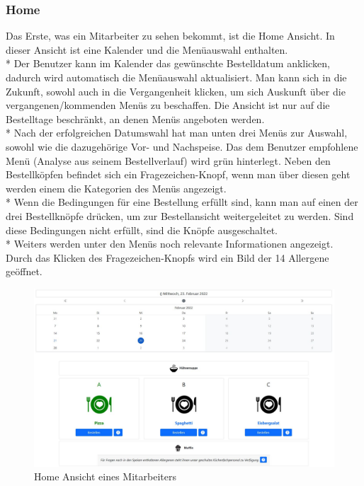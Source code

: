 \subsubsection {Home}
Das Erste, was ein Mitarbeiter zu sehen bekommt, ist die Home Ansicht. In dieser Ansicht ist eine Kalender und die Menüauswahl enthalten. \\*
Der Benutzer kann im Kalender das gewünschte Bestelldatum anklicken, dadurch wird automatisch die Menüauswahl aktualisiert. Man kann sich in die Zukunft, sowohl auch 
in die Vergangenheit klicken, um sich Auskunft über die vergangenen/kommenden Menüs zu beschaffen. Die Ansicht ist nur auf die Bestelltage beschränkt, an denen Menüs angeboten werden.\\*
Nach der erfolgreichen Datumswahl hat man unten drei Menüs zur Auswahl, sowohl wie die dazugehörige Vor- und Nachspeise. Das dem Benutzer empfohlene Menü (Analyse aus seinem Bestellverlauf) wird grün hinterlegt.
Neben den Bestellköpfen befindet sich ein Fragezeichen-Knopf, wenn man über diesen geht werden einem die Kategorien des Menüs angezeigt.
\\* Wenn die Bedingungen für eine Bestellung erfüllt sind,
kann man auf einen der drei Bestellknöpfe drücken, um zur Bestellansicht weitergeleitet zu werden. Sind diese Bedingungen nicht erfüllt, sind die Knöpfe ausgeschaltet. \\*
Weiters werden unter den Menüs noch relevante Informationen angezeigt. Durch das Klicken des Fragezeichen-Knopfs wird ein Bild der 14 Allergene geöffnet.

\begin{figure}[htp]
    \centering
    \includegraphics[scale=0.35]{pics/mitarbeiter-home.JPG}
    \caption{Home Ansicht eines Mitarbeiters}
    \label{fig:impl:HomeMitarbeiter}
\end{figure}

